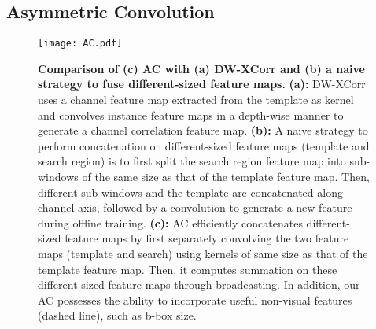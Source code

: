 \documentclass[10pt,twocolumn,letterpaper,final]{cvpr}
\begin{document}
\subsection{Asymmetric Convolution}\label{section:ac}
\begin{figure}
  \centering
  \texttt{[image: AC.pdf]}
  \caption{ \textbf{Comparison of \textbf{(c)} AC with \textbf{(a)} DW-XCorr and \textbf{(b)} a naive strategy to fuse different-sized feature maps.} \textbf{(a):} DW-XCorr uses a  channel feature map extracted from the template as kernel and convolves instance feature maps in a depth-wise manner to generate a  channel correlation feature map. \textbf{(b):} A naive strategy to perform concatenation on different-sized feature maps (template and search region) is to first split the search region feature map into  sub-windows of the same size as that of the template feature map. Then,  different sub-windows and the template are concatenated along channel axis,
followed by a convolution  to generate a new feature during offline training. \textbf{(c):} AC efficiently concatenates different-sized feature maps by first separately convolving the two feature maps (template and search) using kernels of same size as that of the template feature
map. Then, it computes
summation on these different-sized feature maps through broadcasting. In addition, our AC possesses the ability to incorporate useful non-visual features (dashed line), such as b-box size. }
  \label{Fig:AC}
\end{figure}
 
\end{document}

